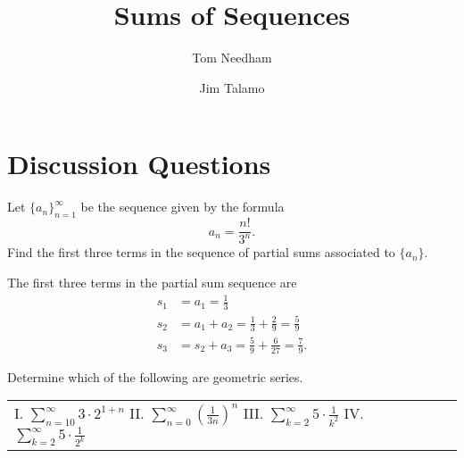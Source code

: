 \documentclass[noauthor, handout]{ximera}
\author{Tom Needham \and Jim Talamo}
\title[]{Sums of Sequences}
\begin{document}
\begin{abstract}
\end{abstract}
\maketitle

\vspace{-0.9in}

\section{Discussion Questions}

\begin{problem}
Let $\{a_n\}_{n=1}^\infty$ be the sequence given by the formula
$$
a_n = \frac{n!}{3^n}.
$$
Find the first three terms in the sequence of partial sums associated to $\{a_n\}$. 
\end{problem}

\begin{freeResponse}
The first three terms in the partial sum sequence are 
\begin{align*}
s_1 &= a_1 = \frac{1}{3} \\
s_2 &= a_1 + a_2 = \frac{1}{3} + \frac{2}{9} = \frac{5}{9} \\
s_3 &= s_2 + a_3 = \frac{5}{9} + \frac{6}{27} = \frac{7}{9}.
\end{align*}
\end{freeResponse}


\begin{problem}
Determine which of the following are geometric series.
\begin{center}
\begin{tabular}{lll}
I. $\sum_{n=10}^\infty 3 \cdot 2^{1+n}$ \hspace{.2in} II. $\sum_{n=0}^\infty \left(\frac{1}{3n}\right)^n$ \hspace{.2in} III. $\sum_{k=2}^\infty 5 \cdot \frac{1}{k^2}$ \hspace{.2in} IV. $\sum_{k=2}^\infty 5 \cdot \frac{1}{2^k}$
\end{tabular}
\end{center}
\end{problem}
\end{document}
